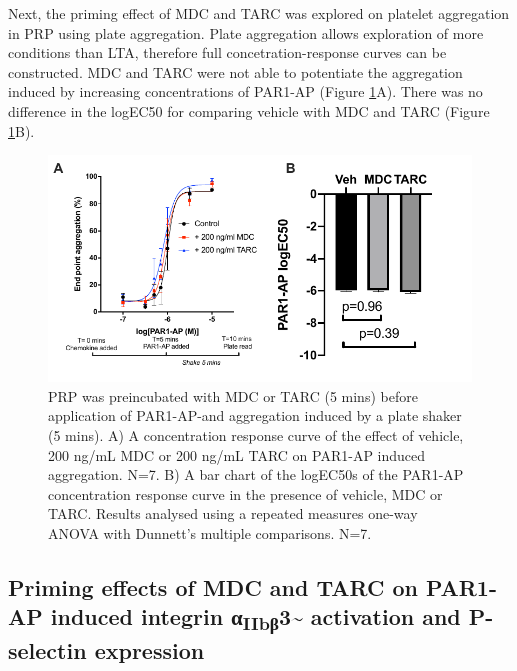 \documentclass[11pt,twoside]{bristolthesis}
\begin{document}
Next, the priming effect of MDC and TARC was explored on platelet aggregation in PRP using plate aggregation. Plate aggregation allows exploration of more conditions than LTA, therefore full concetration-response curves can be constructed. MDC and TARC were not able to potentiate the aggregation induced by increasing concentrations of PAR1-AP (Figure \ref{fig:MDC-TARC-agg-PRP}A). There was no difference in the logEC50 for comparing vehicle with MDC and TARC (Figure \ref{fig:MDC-TARC-agg-PRP}B).



\begin{figure}
\includegraphics{figure/Chemokines/Layouts/MDC_TARC_PRP_plate_agg} \caption[The priming effect of the chemokines MDC and TARC on PAR1-AP induced platelet aggregation in PRP using plate aggregation]{PRP was preincubated with MDC or TARC (5 mins) before application of PAR1-AP-and aggregation induced by a plate shaker (5 mins). A) A concentration response curve of the effect of vehicle, 200 ng/mL MDC or 200 ng/mL TARC on PAR1-AP induced aggregation. N=7. B) A bar chart of the logEC50s of the PAR1-AP concentration response curve in the presence of vehicle, MDC or TARC. Results analysed using a repeated measures one-way ANOVA with Dunnett's multiple comparisons. N=7.}\label{fig:MDC-TARC-agg-PRP}
\end{figure}
\hypertarget{priming-effects-of-mdc-and-tarc-on-par1-ap-induced-integrin-ux3b1iibux3b23-activation-and-p-selectin-expression}{%
\subsection{\texorpdfstring{Priming effects of MDC and TARC on PAR1-AP induced integrin α\textsubscript{IIbβ}3\textasciitilde{} activation and P-selectin expression}{Priming effects of MDC and TARC on PAR1-AP induced integrin αIIbβ3\textasciitilde{} activation and P-selectin expression}}\label{priming-effects-of-mdc-and-tarc-on-par1-ap-induced-integrin-ux3b1iibux3b23-activation-and-p-selectin-expression}}
\end{document}
